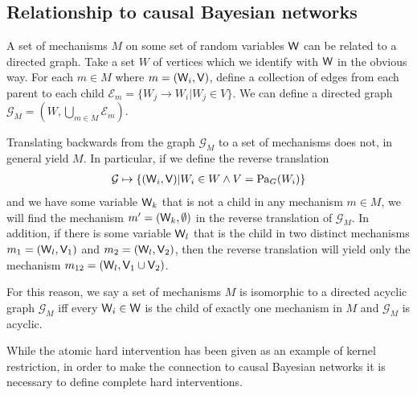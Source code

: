 \subsection{Relationship to causal Bayesian networks}

A set of mechanisms $M$ on some set of random variables $\mathsf{W}$ can be related to a directed graph. Take a set $W$ of vertices which we identify with $\mathsf{W}$ in the obvious way. For each $m\in M$ where $m=(\mathsf{W}_i,\mathsf{V})$, define a collection of edges from each parent to each child $\mathcal{E}_m=\{W_j\to W_i|W_j\in V\}$. We can define a directed graph $\mathcal{G}_M=(W,\bigcup_{m\in M} \mathcal{E}_m)$.

Translating backwards from the graph $\mathcal{G}_M$ to a set of mechanisms does not, in general yield $M$. In particular, if we define the reverse translation 
\begin{align}
    \mathcal{G}\mapsto \{(\mathsf{W}_i,\mathsf{V})|W_i\in W \wedge V=\text{Pa}_{G}(W_i)\} \label{eq:rev_translate}
\end{align}
and we have some variable $\mathsf{W}_k$ that is not a child in any mechanism $m\in M$, we will find the mechanism $m'=(\mathsf{W}_k,\emptyset)$ in the reverse translation of $\mathcal{G}_M$. In addition, if there is some variable $\mathsf{W}_l$ that is the child in two distinct mechanisms $m_1 = (\mathsf{W}_l,\mathsf{V}_1)$ and $m_2=(\mathsf{W}_l,\mathsf{V}_2)$, then the reverse translation will yield only the mechanism $m_{12} = (\mathsf{W}_l, \mathsf{V}_1\cup \mathsf{V}_2)$. 

For this reason, we say a set of mechanisms $M$ is isomorphic to a directed acyclic graph $\mathcal{G}_M$ iff every $\mathsf{W}_i\in \mathsf{W}$ is the child of exactly one mechanism in $M$ and $\mathcal{G}_M$ is acyclic.

While the atomic hard intervention has been given as an example of kernel restriction, in order to make the connection to causal Bayesian networks it is necessary to define complete hard interventions.

